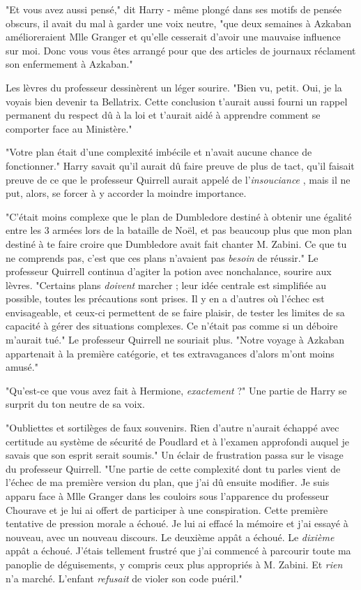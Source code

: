 "Et vous avez aussi pensé," dit Harry - même plongé dans ses motifs de pensée obscurs, il avait du mal à garder une voix neutre, "que deux semaines à Azkaban amélioreraient Mlle Granger et qu'elle cesserait d'avoir une mauvaise influence sur moi. Donc vous vous êtes arrangé pour que des articles de journaux réclament son enfermement à Azkaban."

Les lèvres du professeur dessinèrent un léger sourire. "Bien vu, petit. Oui, je la voyais bien devenir ta Bellatrix. Cette conclusion t'aurait aussi fourni un rappel permanent du respect dû à la loi et t'aurait aidé à apprendre comment se comporter face au Ministère."

"Votre plan était d'une complexité imbécile et n'avait aucune chance de fonctionner." Harry savait qu'il aurait dû faire preuve de plus de tact, qu'il faisait preuve de ce que le professeur Quirrell aurait appelé de l'\emph{insouciance} , mais il ne put, alors, se forcer à y accorder la moindre importance.

"C'était moins complexe que le plan de Dumbledore destiné à obtenir une égalité entre les 3 armées lors de la bataille de Noël, et pas beaucoup plus que mon plan destiné à te faire croire que Dumbledore avait fait chanter M. Zabini. Ce que tu ne comprends pas, c'est que ces plans n'avaient pas \emph{besoin}  de réussir." Le professeur Quirrell continua d'agiter la potion avec nonchalance, sourire aux lèvres. "Certains plans \emph{doivent}  marcher ; leur idée centrale est simplifiée au possible, toutes les précautions sont prises. Il y en a d'autres où l'échec est envisageable, et ceux-ci permettent de se faire plaisir, de tester les limites de sa capacité à gérer des situations complexes. Ce n'était pas comme si un déboire m'aurait tué." Le professeur Quirrell ne souriait plus. "Notre voyage à Azkaban appartenait à la première catégorie, et tes extravagances d'alors m'ont moins amusé."

"Qu'est-ce que vous avez fait à Hermione, \emph{exactement}  ?" Une partie de Harry se surprit du ton neutre de sa voix.

"Oubliettes et sortilèges de faux souvenirs. Rien d'autre n'aurait échappé avec certitude au système de sécurité de Poudlard et à l'examen approfondi auquel je savais que son esprit serait soumis." Un éclair de frustration passa sur le visage du professeur Quirrell. "Une partie de cette complexité dont tu parles vient de l'échec de ma première version du plan, que j'ai dû ensuite modifier. Je suis apparu face à Mlle Granger dans les couloirs sous l'apparence du professeur Chourave et je lui ai offert de participer à une conspiration. Cette première tentative de pression morale a échoué. Je lui ai effacé la mémoire et j'ai essayé à nouveau, avec un nouveau discours. Le deuxième appât a échoué. Le \emph{dixième}  appât a échoué. J'étais tellement frustré que j'ai commencé à parcourir toute ma panoplie de déguisements, y compris ceux plus appropriés à M. Zabini. Et \emph{rien}  n'a marché. L'enfant \emph{refusait}  de violer son code puéril."

